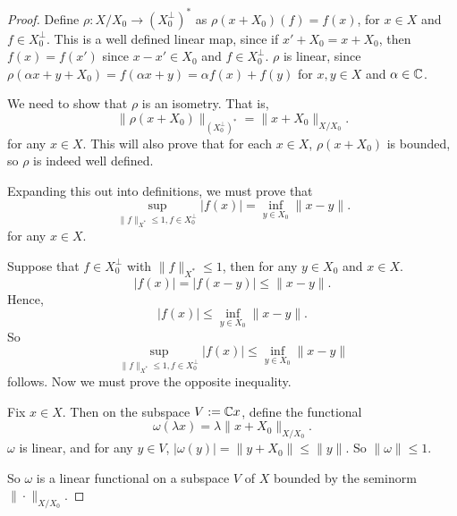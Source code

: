 \documentclass{unswmaths}
\begin{document}
\begin{proof}
    Define $\rho:X/X_0\rightarrow (X_0^\perp)^*$ as $\rho(x+X_0)(f) = f(x)$, for $x \in X$
    and $f \in X_0^\perp$. This is a well defined linear map, since if $x' + X_0 = x+X_0$, then 
    $f(x) = f(x')$ since $x-x' \in X_0$ and $f \in X_0^\perp$. $\rho$ is linear, since $\rho(\alpha x+y+X_0) = f(\alpha x+y) = \alpha f(x) + f(y)$
    for $x,y \in X$ and $\alpha \in \mathbb{C}$.
        
    
    We need to show that $\rho$ is an isometry. That is,
    \begin{equation*}
        \| \rho(x+X_0)\|_{(X_0^\perp)^*} = \| x+X_0\|_{X/X_0}.
    \end{equation*}
    for any $x \in X$. This will also prove that for each $x\in X$, $\rho(x+X_0)$
    is bounded, so $\rho$ is indeed well defined.
    
    Expanding this out into definitions, we must prove that
    \begin{equation}
    \label{isometryCondition}
        \sup_{\|f\|_{X^*} \leq 1, f \in X_0^\perp} |f(x)| = \inf_{y \in X_0} \|x-y\|.
    \end{equation}
    for any $x \in X$.
    
    Suppose that $f \in X_0^\perp$ with $\|f\|_{X^*} \leq 1$, then for any $y \in X_0$
    and $x \in X$.
    \begin{equation*}
        |f(x)| = |f(x-y)| \leq \|x-y\|.
    \end{equation*}
    Hence,
    \begin{equation*}
        |f(x)| \leq \inf_{y \in X_0} \|x-y\|.
    \end{equation*}
    So
    \begin{equation*}
        \sup_{\|f\|_{X^*} \leq 1, f \in X_0^\perp} |f(x)| \leq \inf_{y \in X_0} \|x-y\|
    \end{equation*}
    follows. Now we must prove the opposite inequality. 
    
    Fix $x \in X$. Then on the subspace $V := \mathbb{C} x$, define the functional
    \begin{equation*}
        \omega(\lambda x) = \lambda \|x+X_0\|_{X/X_0}.
    \end{equation*}
    $\omega$ is linear, and for any $y \in V$, $|\omega(y)| = \|y+X_0\| \leq \|y\|$.  So $\|\omega\| \leq 1$.
    
    So $\omega$ is a linear functional on a subspace $V$ of $X$ bounded by the seminorm $\|\cdot\|_{X/X_0}$. 
    

\end{proof}
\end{document}
